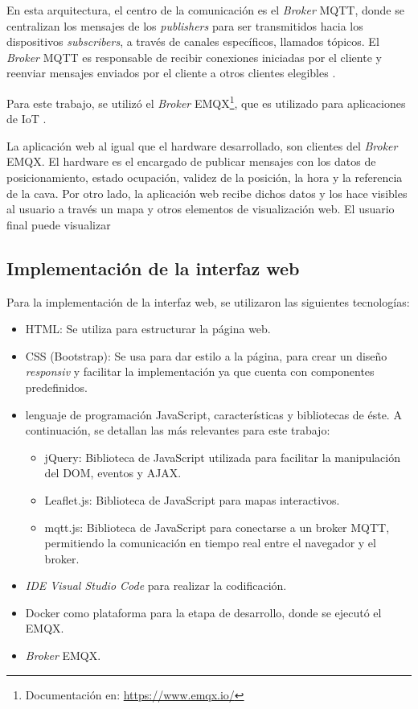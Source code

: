 En esta arquitectura, el centro de la comunicación es el \textit{Broker} MQTT, donde se centralizan los mensajes de los \textit{publishers} para ser transmitidos hacia los dispositivos \textit{subscribers}, a través de canales específicos, llamados tópicos. El \textit{Broker} MQTT es responsable de recibir conexiones iniciadas por el cliente y reenviar mensajes enviados por el cliente a otros clientes elegibles \citep{MasteringMQTT}. 

Para este trabajo, se utilizó el \textit{Broker} EMQX\footnote{Documentación en: \url{https://www.emqx.io/}}, que es utilizado para aplicaciones de IoT \citep{MasteringMQTT}.

La aplicación web al igual que el hardware desarrollado, son clientes del \textit{Broker} EMQX. El hardware es el encargado de publicar mensajes con los datos de posicionamiento, estado ocupación, validez de la posición, la hora y la referencia de la cava. Por otro lado, la aplicación web recibe dichos datos y los hace visibles al usuario a través un mapa y otros elementos de visualización web. El usuario final puede visualizar   

\subsection{Implementación de la interfaz web}

Para la implementación de la interfaz web, se utilizaron las siguientes tecnologías: 

\begin{itemize}
	\item HTML: Se utiliza para estructurar la página web.
	\item CSS (Bootstrap): Se usa para dar estilo a la página, para crear un diseño \textit{responsiv} y facilitar la implementación ya que cuenta con componentes predefinidos.
	\item lenguaje de programación JavaScript, características y bibliotecas de éste. A continuación, se detallan las más relevantes para este trabajo: 
		\begin{itemize}
			\item jQuery: Biblioteca de JavaScript utilizada para facilitar la manipulación del DOM, eventos y AJAX.
			\item Leaflet.js: Biblioteca de JavaScript para mapas interactivos.
			\item mqtt.js: Biblioteca de JavaScript para conectarse a un broker MQTT, permitiendo la comunicación en tiempo real entre el navegador y el broker.
		\end{itemize}
	\item \textit{IDE Visual Studio Code} para realizar la codificación. 
	\item Docker como plataforma para la etapa de desarrollo, donde se ejecutó el EMQX.
	\item \textit{Broker} EMQX. 
\end{itemize}


